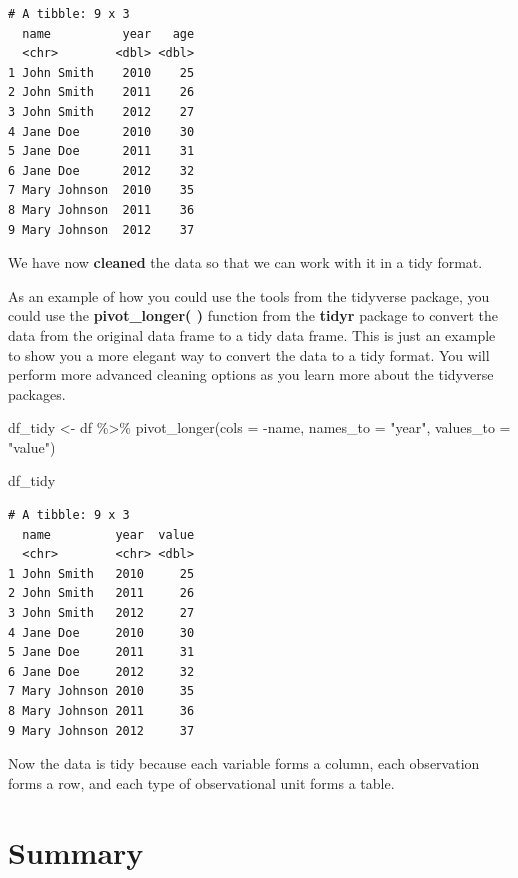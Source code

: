 \documentclass[
  letterpaper,
  DIV=11,
  numbers=noendperiod]{scrreprt}
\newenvironment{Shaded}{\begin{snugshade}}{\end{snugshade}}
\newcommand{\AttributeTok}[1]{\textcolor[rgb]{0.40,0.45,0.13}{#1}}
\newcommand{\FunctionTok}[1]{\textcolor[rgb]{0.28,0.35,0.67}{#1}}
\newcommand{\NormalTok}[1]{\textcolor[rgb]{0.00,0.23,0.31}{#1}}
\newcommand{\OtherTok}[1]{\textcolor[rgb]{0.00,0.23,0.31}{#1}}
\newcommand{\SpecialCharTok}[1]{\textcolor[rgb]{0.37,0.37,0.37}{#1}}
\newcommand{\StringTok}[1]{\textcolor[rgb]{0.13,0.47,0.30}{#1}}
\begin{document}
\begin{verbatim}
# A tibble: 9 x 3
  name          year   age
  <chr>        <dbl> <dbl>
1 John Smith    2010    25
2 John Smith    2011    26
3 John Smith    2012    27
4 Jane Doe      2010    30
5 Jane Doe      2011    31
6 Jane Doe      2012    32
7 Mary Johnson  2010    35
8 Mary Johnson  2011    36
9 Mary Johnson  2012    37
\end{verbatim}

We have now \textbf{cleaned} the data so that we can work with it in a
tidy format.

As an example of how you could use the tools from the tidyverse package,
you could use the \textbf{pivot\_longer( )} function from the
\textbf{tidyr} package to convert the data from the original data frame
to a tidy data frame. This is just an example to show you a more elegant
way to convert the data to a tidy format. You will perform more advanced
cleaning options as you learn more about the tidyverse packages.

\begin{Shaded}
\begin{Highlighting}[]
\NormalTok{df\_tidy }\OtherTok{\textless{}{-}}\NormalTok{ df }\SpecialCharTok{\%\textgreater{}\%} 
  \FunctionTok{pivot\_longer}\NormalTok{(}\AttributeTok{cols =} \SpecialCharTok{{-}}\NormalTok{name, }\AttributeTok{names\_to =} \StringTok{"year"}\NormalTok{, }\AttributeTok{values\_to =} \StringTok{"value"}\NormalTok{)}

\NormalTok{df\_tidy}
\end{Highlighting}
\end{Shaded}

\begin{verbatim}
# A tibble: 9 x 3
  name         year  value
  <chr>        <chr> <dbl>
1 John Smith   2010     25
2 John Smith   2011     26
3 John Smith   2012     27
4 Jane Doe     2010     30
5 Jane Doe     2011     31
6 Jane Doe     2012     32
7 Mary Johnson 2010     35
8 Mary Johnson 2011     36
9 Mary Johnson 2012     37
\end{verbatim}

Now the data is tidy because each variable forms a column, each
observation forms a row, and each type of observational unit forms a
table.

\section*{Summary}\label{summary}
\end{document}
